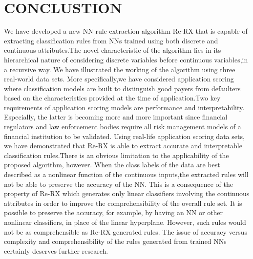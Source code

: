 \documentclass[a4paper,14pt,onecolumn]{article}
\begin{document}
\newpage
\section{CONCLUSTION}
We have developed a new NN rule extraction algorithm Re-RX that is capable of extracting classification rules from NNs trained using both discrete and continuous attributes.The novel characteristic of the algorithm lies in its hierarchical nature of considering discrete variables before continuous variables,in a recursive way. We have illustrated the working of the algorithm using three real-world data sets. More specifically,we have considered application scoring where classification models are built to distinguish good payers from defaulters based on the characteristics provided at the time of application.Two key requirements of application scoring models are performance and interpretability. Especially, the latter is becoming more and more important since financial regulators and law enforcement bodies require all risk management models of a financial institution to be validated. Using real-life application scoring data sets, we have demonstrated that Re-RX is able to extract accurate and interpretable classification rules.There is an obvious limitation to the applicability of the proposed algorithm, however. When the class labels of the data are best described as a nonlinear function of the continuous inputs,the extracted rules will not be able to preserve the accuracy of the NN. This is a consequence of the property of Re-RX which generates only linear classifiers involving the continuous attributes in order to improve the comprehensibility of the overall rule set. It is possible to preserve the accuracy, for example, by having an NN or other nonlinear classifiers, in place of the linear hyperplane. However, such rules would not be as comprehensible as Re-RX generated rules. The issue of accuracy versus complexity and comprehensibility of the rules generated from trained NNs certainly deserves further research.

\newpage
\appendix
\end{document}
